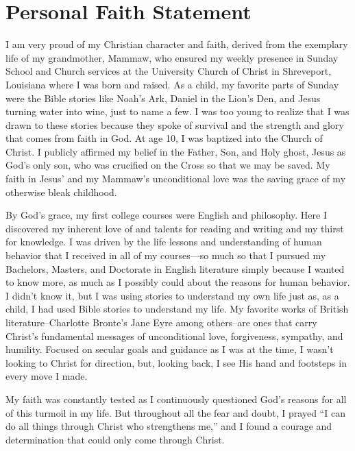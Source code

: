 \documentclass{article}
\begin{document}
\pagestyle{empty}

\section*{Personal Faith Statement}

I am very proud of my Christian character and faith, derived from the exemplary life of my grandmother, Mammaw, who ensured my weekly presence in Sunday School and Church services at the University Church of Christ in Shreveport, Louisiana where I was born and raised. 
As a child, my favorite parts of Sunday were the Bible stories like Noah’s Ark, Daniel in the Lion’s Den, and Jesus turning water into wine, just to name a few. 
I was too young to realize that I was drawn to these stories because they spoke of survival and the strength and glory that comes from faith in God. 
At age 10, I was baptized into the Church of Christ. 
I publicly affirmed my belief in the Father, Son, and Holy ghost, Jesus as God's only son, who was crucified on the Cross so that we may be  saved. 
My faith in Jesus' and my Mammaw's unconditional love was the saving grace of my otherwise bleak childhood. 

By God's grace, my first college courses were English and philosophy. 
Here I discovered my inherent love of and talents for reading and writing and my thirst for knowledge.  
I was driven by the life lessons and understanding of human behavior that I received in all of my courses—so much so that I pursued my Bachelors, Masters, and Doctorate in English literature simply because I wanted to know more, as much as I possibly could about the reasons for human behavior. 
I didn't know it, but I was using stories to understand my own life just as, as a child,  I had used Bible stories to understand my life. 
My favorite works of British literature--Charlotte Bronte's Jane Eyre among others--are ones that carry Christ's fundamental messages of unconditional love, forgiveness, sympathy, and humility. 
Focused on secular goals and guidance as I was at the time, I wasn't looking to Christ for direction, but, looking back, I see His hand and footsteps in every move I made. 
 
My faith was constantly tested as I continuously questioned God's reasons for all of this turmoil in my life. 
But throughout all the fear and doubt, I prayed ``I can do all things through Christ who strengthens me,'' and I found a courage and determination that could only come through Christ. 
\end{document}
